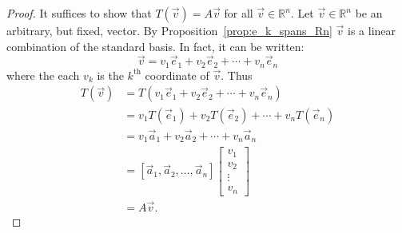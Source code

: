 \begin{proof}
It suffices to show that $T(\vec{v})=A\vec{v}$ for all 
$\vec{v} \in \mathbb{R}^n$.
Let $\vec{v} \in \mathbb{R}^n$ be an arbitrary, but fixed, vector. By 
Proposition~\ref{prop:e_k_spans_Rn} $\vec{v}$ is a linear combination of the 
standard basis. In fact, it can be written:
\[
\vec{v}=v_1\vec{e}_1+v_2\vec{e}_2+\cdots+v_n\vec{e}_n
\]
where the each $v_k$ is the $k^{\text{th}}$ coordinate of $\vec{v}$. Thus
\begin{align*}
T(\vec{v}) 
&=T(v_1\vec{e}_1+v_2\vec{e}_2+\cdots+v_n\vec{e}_n)\\
&=v_1T(\vec{e}_1)+v_2T(\vec{e}_2)+\cdots+v_nT(\vec{e}_n)\\
&=v_1\vec{a}_1+v_2\vec{a}_2+\cdots+v_n\vec{a}_n\\
&=[\vec{a}_1,\vec{a}_2,\ldots,\vec{a}_n]
\begin{bmatrix}v_1\\v_2\\\vdots\\v_n\end{bmatrix}\\
&=A\vec{v}.
\end{align*}
\end{proof}

